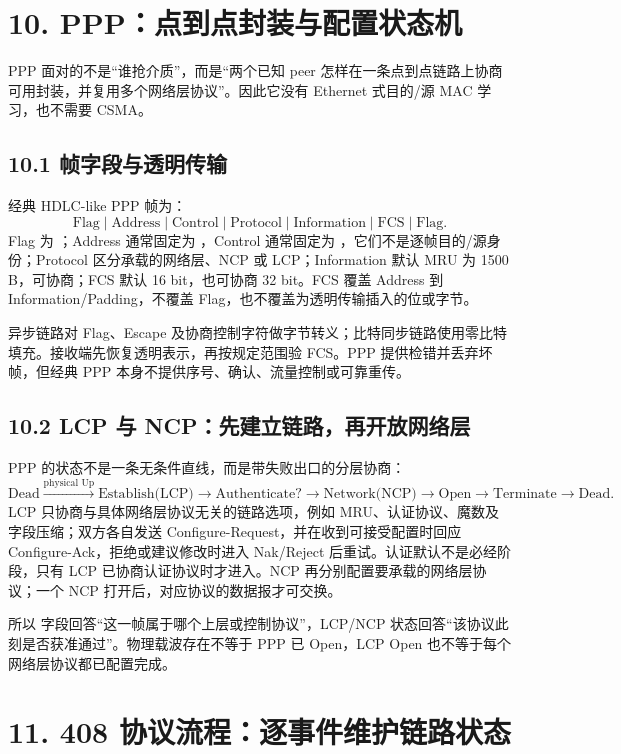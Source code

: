 \documentclass[UTF8,fontset=none,11pt,a4paper]{ctexart}
\begin{document}
\section{10. PPP：点到点封装与配置状态机}

PPP 面对的不是“谁抢介质”，而是“两个已知 peer 怎样在一条点到点链路上协商可用封装，并复用多个网络层协议”。因此它没有 Ethernet 式目的/源 MAC 学习，也不需要 CSMA。

\subsection{10.1 帧字段与透明传输}

经典 HDLC-like PPP 帧为：
\[
\boxed{\text{Flag}\mid\text{Address}\mid\text{Control}\mid\text{Protocol}
\mid\text{Information}\mid\text{FCS}\mid\text{Flag}}.
\]
Flag 为 ；Address 通常固定为 ，Control 通常固定为 ，它们不是逐帧目的/源身份；Protocol 区分承载的网络层、NCP 或 LCP；Information 默认 MRU 为 1500 B，可协商；FCS 默认 16 bit，也可协商 32 bit。FCS 覆盖 Address 到 Information/Padding，不覆盖 Flag，也不覆盖为透明传输插入的位或字节。

异步链路对 Flag、Escape 及协商控制字符做字节转义；比特同步链路使用零比特填充。接收端先恢复透明表示，再按规定范围验 FCS。PPP 提供检错并丢弃坏帧，但经典 PPP 本身不提供序号、确认、流量控制或可靠重传。

\subsection{10.2 LCP 与 NCP：先建立链路，再开放网络层}

PPP 的状态不是一条无条件直线，而是带失败出口的分层协商：
\[
\text{Dead}\xrightarrow{\text{physical Up}}
\text{Establish(LCP)}\to
\text{Authenticate?}\to
\text{Network(NCP)}\to
\text{Open}\to\text{Terminate}\to\text{Dead}.
\]
LCP 只协商与具体网络层协议无关的链路选项，例如 MRU、认证协议、魔数及字段压缩；双方各自发送 Configure-Request，并在收到可接受配置时回应 Configure-Ack，拒绝或建议修改时进入 Nak/Reject 后重试。认证默认不是必经阶段，只有 LCP 已协商认证协议时才进入。NCP 再分别配置要承载的网络层协议；一个 NCP 打开后，对应协议的数据报才可交换。

所以  字段回答“这一帧属于哪个上层或控制协议”，LCP/NCP 状态回答“该协议此刻是否获准通过”。物理载波存在不等于 PPP 已 Open，LCP Open 也不等于每个网络层协议都已配置完成。

\section{11. 408 协议流程：逐事件维护链路状态}
\end{document}

